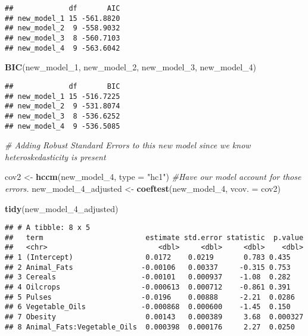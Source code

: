 \documentclass[
]{article}
\newenvironment{Shaded}{\begin{snugshade}}{\end{snugshade}}
\newcommand{\CommentTok}[1]{\textcolor[rgb]{0.56,0.35,0.01}{\textit{#1}}}
\newcommand{\DataTypeTok}[1]{\textcolor[rgb]{0.13,0.29,0.53}{#1}}
\newcommand{\DecValTok}[1]{\textcolor[rgb]{0.00,0.00,0.81}{#1}}
\newcommand{\KeywordTok}[1]{\textcolor[rgb]{0.13,0.29,0.53}{\textbf{#1}}}
\newcommand{\NormalTok}[1]{#1}
\newcommand{\StringTok}[1]{\textcolor[rgb]{0.31,0.60,0.02}{#1}}
\begin{document}
\begin{verbatim}
##             df       AIC
## new_model_1 15 -561.8820
## new_model_2  9 -558.9032
## new_model_3  8 -560.7103
## new_model_4  9 -563.6042
\end{verbatim}

\begin{Shaded}
\begin{Highlighting}[]
\KeywordTok{BIC}\NormalTok{(new_model_}\DecValTok{1}\NormalTok{, new_model_}\DecValTok{2}\NormalTok{, new_model_}\DecValTok{3}\NormalTok{, new_model_}\DecValTok{4}\NormalTok{)}
\end{Highlighting}
\end{Shaded}

\begin{verbatim}
##             df       BIC
## new_model_1 15 -516.7225
## new_model_2  9 -531.8074
## new_model_3  8 -536.6252
## new_model_4  9 -536.5085
\end{verbatim}

\begin{Shaded}
\begin{Highlighting}[]
\CommentTok{# Adding Robust Standard Errors to this new model since we know heteroskedasticity is present }

\NormalTok{cov2 <-}\StringTok{ }\KeywordTok{hccm}\NormalTok{(new_model_}\DecValTok{4}\NormalTok{, }\DataTypeTok{type =} \StringTok{"hc1"}\NormalTok{)}
\CommentTok{#Have our model account for those errors. }
\NormalTok{new_model_}\DecValTok{4}\NormalTok{_adjusted <-}\StringTok{ }\KeywordTok{coeftest}\NormalTok{(new_model_}\DecValTok{4}\NormalTok{, }\DataTypeTok{vcov. =}\NormalTok{ cov2)}

\KeywordTok{tidy}\NormalTok{(new_model_}\DecValTok{4}\NormalTok{_adjusted)}
\end{Highlighting}
\end{Shaded}

\begin{verbatim}
## # A tibble: 8 x 5
##   term                        estimate std.error statistic  p.value
##   <chr>                          <dbl>     <dbl>     <dbl>    <dbl>
## 1 (Intercept)                 0.0172    0.0219       0.783 0.435   
## 2 Animal_Fats                -0.00106   0.00337     -0.315 0.753   
## 3 Cereals                    -0.00101   0.000937    -1.08  0.282   
## 4 Oilcrops                   -0.000613  0.000712    -0.861 0.391   
## 5 Pulses                     -0.0196    0.00888     -2.21  0.0286  
## 6 Vegetable_Oils             -0.000868  0.000600    -1.45  0.150   
## 7 Obesity                     0.00143   0.000389     3.68  0.000327
## 8 Animal_Fats:Vegetable_Oils  0.000398  0.000176     2.27  0.0250
\end{verbatim}
\end{document}
